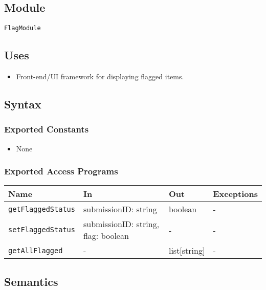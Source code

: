 \documentclass[12pt, titlepage]{article}
\begin{document}
\subsection{Module}

\texttt{FlagModule}

\subsection{Uses}

\begin{itemize}
    \item Front-end/UI framework for displaying flagged items.
\end{itemize}

\subsection{Syntax}

\subsubsection{Exported Constants}

\begin{itemize}
    \item None
\end{itemize}

\subsubsection{Exported Access Programs}

\begin{center}
\begin{tabular}{p{5cm} p{3.5cm} p{3.5cm} p{2cm}}
\hline
\textbf{Name} & \textbf{In} & \textbf{Out} & \textbf{Exceptions} \\
\hline
\texttt{getFlaggedStatus} & submissionID: string & boolean & - \\
\texttt{setFlaggedStatus} & submissionID: string, flag: boolean & - & - \\
\texttt{getAllFlagged} & - & list[string] & - \\
\hline
\end{tabular}
\end{center}

\subsection{Semantics}
\end{document}
